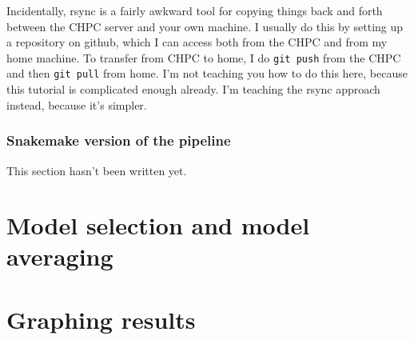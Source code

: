 \documentclass[11pt]{article}
\begin{document}
Incidentally, rsync is a fairly awkward tool for copying things back
and forth between the CHPC server and your own machine. I usually do
this by setting up a repository on github, which I can access both
from the CHPC and from my home machine. To transfer from CHPC to home,
I do \texttt{git push} from the CHPC and then \texttt{git pull} from
home. I'm not teaching you how to do this here, because this tutorial
is complicated enough already. I'm teaching the rsync approach
instead, because it's simpler.

\subsubsection{Snakemake version of the pipeline}
\label{sec.snakemake}
This section hasn't been written yet.

\section{Model selection and model averaging}
\label{sec.msma}

\section{Graphing results}
\label{sec.graph}

\printbibliography
\end{document}
